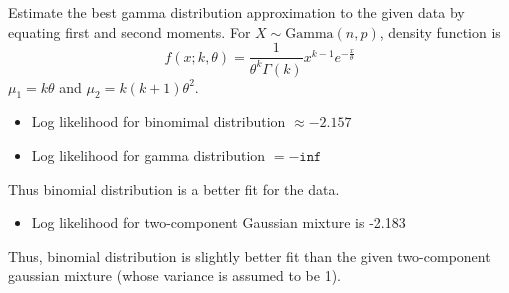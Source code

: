 \begin{solution}
	Estimate the best gamma distribution approximation to the given data by equating first and second moments. For $X\sim\text{Gamma}(n,p)$, density function is
	\begin{equation}
		f(x; k, \theta) = \frac{1}{\theta^k\Gamma(k)} x^{k-1} e^{-\frac{x}{\theta}}
	\end{equation}
	$\mu_1 = k\theta$ and $\mu_2 = k(k+1)\theta^2$.

	\begin{itemize}
		\item Log likelihood for binomimal distribution $\approx -2.157$
		\item Log likelihood for gamma distribution $= -\texttt{inf}$
	\end{itemize}
	Thus binomial distribution is a better fit for the data.

	\begin{itemize}
		\item Log likelihood for two-component Gaussian mixture is -2.183
	\end{itemize}
	Thus, binomial distribution is slightly better fit than the given two-component gaussian mixture (whose variance is assumed to be 1).
\end{solution}
